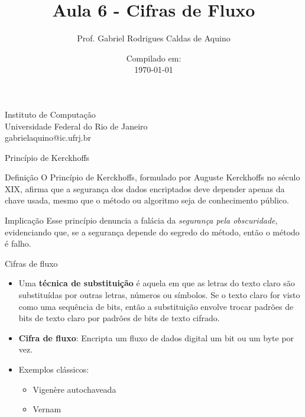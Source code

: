 \title{Aula 6 - Cifras de Fluxo}

\author{Prof. Gabriel Rodrigues Caldas de Aquino}

\institute
{
    Instituto de Computação \\
    Universidade Federal do Rio de Janeiro\\
    gabrielaquino@ic.ufrj.br%
}
\date{Compilado em: \\ \today} %




\begin{frame}
    \titlepage
\end{frame}

\begin{frame}{Princípio de Kerckhoffs}
\begin{block}{Definição}
O Princípio de Kerckhoffs, formulado por Auguste Kerckhoffs no século XIX, afirma que a segurança dos dados encriptados deve depender apenas da chave usada, mesmo que o método ou algoritmo seja de conhecimento público.
\end{block}

\begin{block}{Implicação}
Esse princípio denuncia a falácia da \textit{segurança pela obscuridade}, evidenciando que, se a segurança depende do segredo do método, então o método é falho.
\end{block}
\end{frame}



\begin{frame}{Cifras de fluxo}
\begin{itemize}
    \item Uma \textbf{técnica de substituição} é aquela em que as letras do texto claro são substituídas por outras letras, números ou símbolos.  Se o texto claro for visto como uma sequência de bits, então a substituição envolve trocar
padrões de bits de texto claro por padrões de bits de texto cifrado.
\end{itemize}

    \begin{itemize}
        \item \textbf{Cifra de fluxo}: Encripta um fluxo de dados digital um bit ou um byte por vez.
        \item Exemplos clássicos: 
        \begin{itemize}
            \item Vigenère autochaveada
            \item Vernam
        \end{itemize}
    \end{itemize}
\end{frame}

